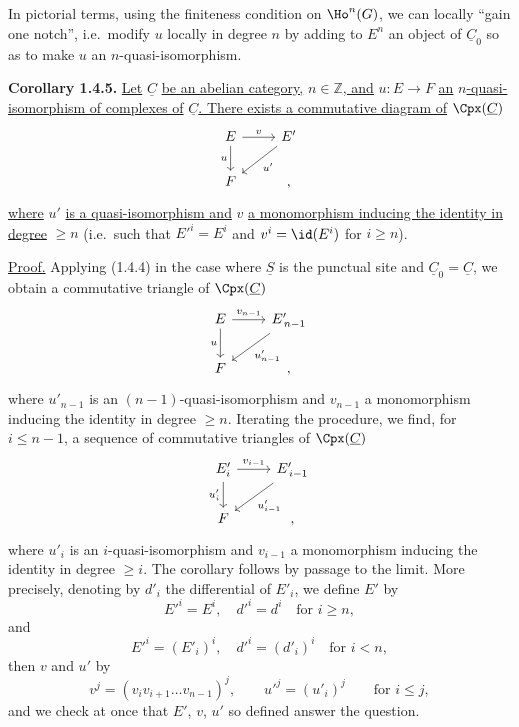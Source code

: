 In pictorial terms, using the finiteness condition on \(\Ho^n(G)\), we can locally ``gain one notch'', i.e.\ modify \(u\) locally in degree \(n\) by adding to \(E^n\) an object of \(\underline{C}_0\) so as to make \(u\) an \(n\)-quasi-isomorphism.

\textbf{Corollary 1.4.5.} \uline{Let} \(\underline{C}\) \uline{be an abelian category,} \(n\in\mathbb Z\)\uline{, and} \(u:E\to F\) \uline{an} \(n\)\uline{-quasi-isomorphism of complexes of} \(\underline{C}\)\uline{. There exists a commutative diagram of} \(\Cpx(\underline{C})\)
\[
\begin{tikzcd}
E \arrow[r,"v"] \arrow[d,"u"'] & E' \arrow[dl,"u'"]\\
F & ,
\end{tikzcd}
\]
%
\uline{where} \(u'\) \uline{is a quasi-isomorphism and} \(v\) \uline{a monomorphism inducing the identity in degree} \(\geq n\) (i.e.\ such that \(E'^i=E^i\) and \(v^i=\id(E^i)\) for \(i\geq n\)).

\uline{Proof.} Applying (1.4.4) in the case where \(\underline{S}\) is the punctual site and \(\underline{C}_0=\underline{C}\), we obtain a commutative triangle of \(\Cpx(\underline{C})\)
\[
\begin{tikzcd}
E \arrow[r,"v_{n-1}"] \arrow[d,"u"'] & E'_{\,n-1} \arrow[dl,"u'_{n-1}"]\\
F & ,
\end{tikzcd}
\]
where \(u'_{n-1}\) is an \((n-1)\)-quasi-isomorphism and \(v_{n-1}\) a monomorphism inducing the identity in degree \(\geq n\). Iterating the procedure, we find, for \(i\leq n-1\), a sequence of commutative triangles of \(\Cpx(\underline{C})\)
\[
\begin{tikzcd}
E'_i \arrow[r,"v_{i-1}"] \arrow[d,"u'_i"'] & E'_{\,i-1} \arrow[dl,"u'_{i-1}"]\\
F & ,
\end{tikzcd}
\]
where \(u'_i\) is an \(i\)-quasi-isomorphism and \(v_{i-1}\) a monomorphism inducing the identity in degree \(\geq i\). The corollary follows by passage to the limit. More precisely, denoting by \(d'_i\) the differential of \(E'_i\), we define \(E'\) by
\[
  E'^i=E^i,\quad d'^i=d^i\quad\text{for }i\geq n,
\]
and
\[
  E'^i=(E'_i)^i,\quad d'^i=(d'_i)^i\quad\text{for }i<n,
\]
then \(v\) and \(u'\) by
\[
  v^j=(v_i v_{i+1}\ldots v_{n-1})^j,\qquad u'^j=(u'_i)^j\qquad\text{for }i\leq j,
\]
and we check at once that \(E'\), \(v\), \(u'\) so defined answer the question.

